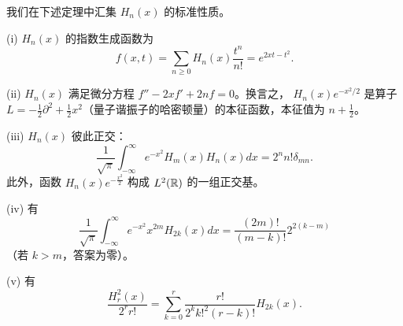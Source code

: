我们在下述定理中汇集 $H_n(x)$ 的标准性质。

\begin{theorem} \label{Hermite}
(i) $H_n(x)$ 的指数生成函数为
$$
f(x,t)=\sum_{n\ge 0}H_n(x)\frac{t^n}{n!}
=e^{2xt-t^2}.
$$ 

(ii) $H_n(x)$ 满足微分方程
$f''-2xf'+2nf=0$。换言之，
$H_n(x)e^{-x^2/2}$ 是算子 $L=-\frac{1}{2}\partial^2+\frac{1}{2}x^2$（量子谐振子的哈密顿量）的本征函数，本征值为 $n+\frac{1}{2}$。

(iii) $H_n(x)$ 彼此正交：
$$
\frac{1}{\sqrt{\pi}}\int_{-\infty}^{\infty}e^{-x^2}H_m(x)H_n(x)dx=
2^nn!\delta_{mn}.
$$
此外，函数 $H_n(x)e^{-\frac{x^2}{2}}$ 构成 $L^2(\Bbb R)$ 的一组正交基。  

(iv) 有
$$
\frac{1}{\sqrt{\pi}}\int_{-\infty}^{\infty}e^{-x^2}x^{2m}H_{2k}(x)dx=
\frac{(2m)!}{(m-k)!}2^{2(k-m)}
$$
（若 $k>m$，答案为零）。

(v) 有
$$
\frac{H_r^2(x)}{2^rr!}=\sum_{k=0}^r\frac{r!}{2^kk!^2(r-k)!}H_{2k}(x).
$$
\end{theorem}
 
